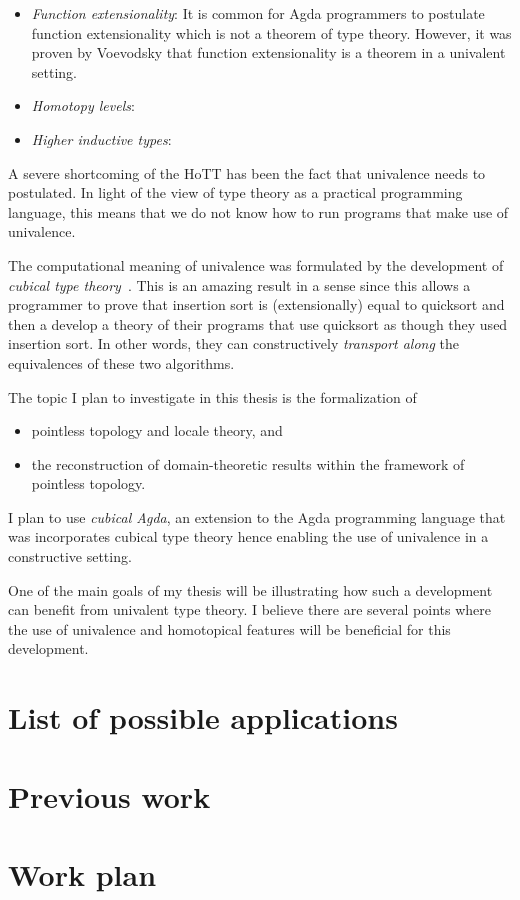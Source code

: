 \documentclass[11pt]{article}
\begin{document}
\begin{itemize}
  \item \emph{Function extensionality}: It is common for Agda programmers to postulate
    function extensionality which is not a theorem of type theory. However, it was proven
    by Voevodsky that function extensionality is a theorem in a univalent setting.
  \item \emph{Homotopy levels}:
  \item \emph{Higher inductive types}:
\end{itemize}

A severe shortcoming of the HoTT has been the fact that univalence needs to postulated. In
light of the view of type theory as a practical programming language, this means that we
do not know how to run programs that make use of univalence.

The computational meaning of univalence was formulated by the development of \emph{cubical
type theory}~\cite{cubicaltt}. This is an amazing result in a sense since this allows a
programmer to prove that insertion sort is (extensionally) equal to quicksort and then a
develop a theory of their programs that use quicksort as though they used insertion sort.
In other words, they can constructively \emph{transport along} the equivalences of these
two algorithms.

The topic I plan to investigate in this thesis is the formalization of

\begin{itemize}
  \item pointless topology and locale theory, and
  \item the reconstruction of domain-theoretic results within the framework of pointless
    topology.
\end{itemize}

I plan to use \emph{cubical Agda}, an extension to the Agda programming language that was
incorporates cubical type theory hence enabling the use of univalence in a constructive
setting.

One of the main goals of my thesis will be illustrating how such a development can benefit
from univalent type theory. I believe there are several points where the use of univalence
and homotopical features will be beneficial for this development.


\section{List of possible applications}

\section{Previous work}

\section{Work plan}



\end{document}
